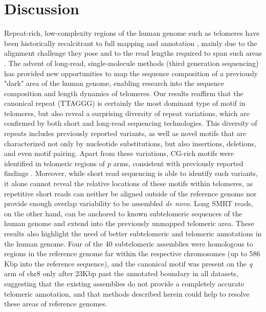 \documentclass{article}
\begin{document}
\section*{Discussion} 
Repeat-rich, low-complexity regions of the human genome such as telomeres have been historically recalcitrant to full mapping and annotation \cite{miga2015}, mainly due to the alignment challenge they pose and to the read lengths required to span such areas \cite{ngslowcomplexity}.
The advent of long-read, single-molecule methods (third generation sequencing) has provided new opportunities to map the sequence composition of a previously "dark" area of the human genome, enabling research into the sequence composition and length dynamics \cite{luxton2020} of telomeres. %
Our results reaffirm that the canonical repeat (TTAGGG) is certainly the most dominant type of motif in telomeres, but also reveal a surprising diversity of repeat variations, which are confirmed by both short and long-read sequencing technologies.
This diversity of repeats includes previously reported variants, as well as novel motifs that are characterized not only by nucleotide substitutions, but also insertions, deletions, and even motif pairing.
Apart from these variations, CG-rich motifs were identified in telomeric regions of \textit{p} arms, consistent with previously reported findings \cite{cpg}.
Moreover, while short read sequencing is able to identify such variants, it alone cannot reveal the relative locations of these motifs within telomeres, as repetitive short reads can neither be aligned outside of the reference genome nor provide enough overlap variability to be assembled \textit{de novo}. %
Long SMRT reads, on the other hand, can be anchored to known subtelomeric sequences of the human genome and extend into the previously unmapped telomeric area.
These results also highlight the need of better subtelomeric and telomeric annotations in the human genome.
Four of the 40 subtelomeric assemblies \cite{riethman2014} were homologous to regions in the reference genome far within the respective chromosomes (up to 586 Kbp into the reference sequence), and the canonical motif was present on the \textit{q} arm of chr8 only after 2\textendash{}3Kbp past the annotated boundary in all datasets, suggesting that the existing assemblies do not provide a completely accurate telomeric annotation, and that methods described herein could help to resolve these areas of reference genomes.
\end{document}
